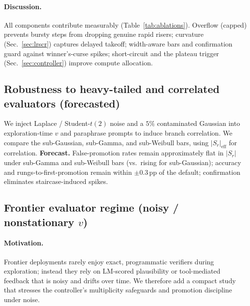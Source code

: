 \documentclass{article}
\begin{document}
\paragraph{Discussion.}
All components contribute measurably (Table~\ref{tab:ablations}).
Overflow (capped) prevents bursty steps from dropping genuine rapid risers; curvature (Sec.~\ref{sec:lrscr}) captures delayed takeoff; width-aware bars and confirmation guard against winner's-curse spikes; short-circuit and the plateau trigger (Sec.~\ref{sec:controller}) improve compute allocation.




\subsection{Robustness to heavy-tailed and correlated evaluators (forecasted)}
\label{subsec:robustness}
We inject Laplace / Student-$t(2)$ noise and a $5\%$ contaminated Gaussian into exploration-time $v$ and paraphrase prompts to induce branch correlation.
We compare the sub-Gaussian, sub-Gamma, and sub-Weibull bars, using $|S_r|_{\mathrm{eff}}$ for correlation.
\textbf{Forecast.} False-promotion rates remain approximately flat in $|S_r|$ under sub-Gamma and sub-Weibull bars (vs.\ rising for sub-Gaussian);
accuracy and rungs-to-first-promotion remain within $\pm 0.3$\,pp of the default; confirmation eliminates staircase-induced spikes.



\subsection{Frontier evaluator regime (noisy / nonstationary $v$)}
\label{subsec:frontier-eval}

\paragraph{Motivation.}
Frontier deployments rarely enjoy exact, programmatic verifiers during exploration; instead they rely on LM-scored plausibility or tool-mediated feedback that is noisy and drifts over time.
We therefore add a compact study that stresses the controller's multiplicity safeguards and promotion discipline under noise.
\end{document}
